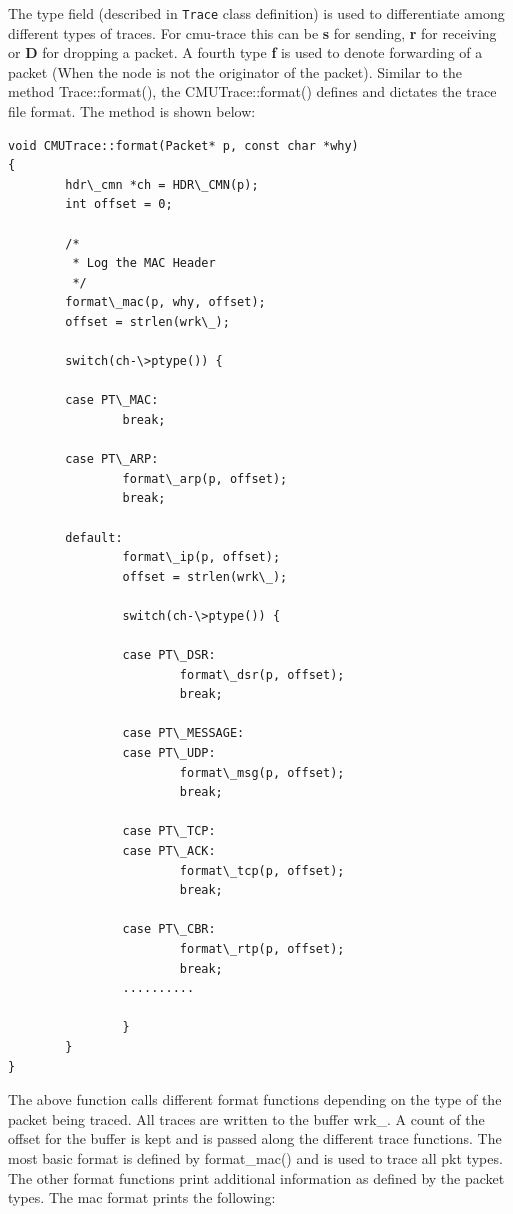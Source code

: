 The type field (described in {\tt Trace} class definition) is used to
differentiate among different types of traces. For cmu-trace this can be
{\bf s} for sending, {\bf r} for receiving or {\bf D} for dropping a
packet. A fourth type {\bf f} is used to denote forwarding of a packet
(When the node is not the originator of the packet). 
Similar to the method Trace::format(), the CMUTrace::format() defines and
dictates the trace file format. The method is shown below: 
\begin{verbatim}
void CMUTrace::format(Packet* p, const char *why)
{
        hdr\_cmn *ch = HDR\_CMN(p);
        int offset = 0;

        /*
         * Log the MAC Header
         */
        format\_mac(p, why, offset);
        offset = strlen(wrk\_);

        switch(ch-\>ptype()) {

        case PT\_MAC:
                break;

        case PT\_ARP:
                format\_arp(p, offset);
                break;

        default:
                format\_ip(p, offset);
                offset = strlen(wrk\_);

                switch(ch-\>ptype()) {

                case PT\_DSR:
                        format\_dsr(p, offset);
                        break;

                case PT\_MESSAGE:
                case PT\_UDP:
                        format\_msg(p, offset);
                        break;
                        
                case PT\_TCP:
                case PT\_ACK:
                        format\_tcp(p, offset);
                        break;
                        
                case PT\_CBR:
                        format\_rtp(p, offset);
                        break;
                ..........

                }
        }
}
\end{verbatim}
The above function calls different format functions depending on the type
of the packet being traced. All traces are written to the buffer wrk\_. A
count of the offset for the buffer is kept and is passed along the
different trace functions. The most basic format is defined by
format\_mac() and is used to trace all pkt types. The other format
functions print additional information as defined by the packet types. The
mac format prints the following:   
